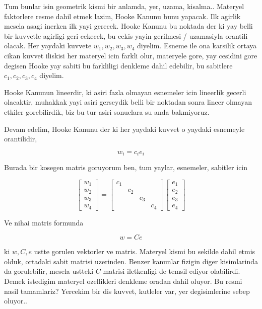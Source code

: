 \documentclass[12pt,fleqn]{article}\usepackage{../../common}
\begin{document}
Tum bunlar isin geometrik kismi bir anlamda, yer, uzama, kisalma.. Materyel
faktorlere resme dahil etmek lazim, Hooke Kanunu bunu yapacak. Ilk agirlik
mesela asagi inerken ilk yayi gerecek. Hooke Kanunu bu noktada der ki yay belli
bir kuvvetle agirligi geri cekecek, bu cekis yayin gerilmesi / uzamasiyla
orantili olacak. Her yaydaki kuvvete $w_1,w_2,w_3,w_4$ diyelim. Esneme ile ona
karsilik ortaya cikan kuvvet iliskisi her materyel icin farkli olur, materyele
gore, yay cesidini gore degisen Hooke yay sabiti bu farkliligi denkleme dahil
edebilir, bu sabitlere $c_1,c_2,c_3,c_4$ diyelim.

Hooke Kanunun lineerdir, ki asiri fazla olmayan esnemeler icin lineerlik
gecerli olacaktir, muhakkak yayi asiri gerseydik belli bir noktadan sonra
lineer olmayan etkiler gorebilirdik, biz bu tur asiri sonuclara su anda
bakmiyoruz.

Devam edelim, Hooke Kanunu der ki her yaydaki kuvvet o yaydaki esnemeyle orantilidir,

$$
w_i = c_i e_i 
$$

Burada bir kosegen matris goruyorum ben, tum yaylar, esnemeler, sabitler icin

$$
\left[\begin{array}{c}
w_1 \\ w_2 \\ w_3 \\ w_4
\end{array}\right] =
\left[\begin{array}{cccc}
c_1 & & & \\  & c_2 & & \\  & & c_3 & \\ & & & c_4
\end{array}\right]
\left[\begin{array}{c}
e_1 \\ e_2 \\ e_3 \\ e_4
\end{array}\right] 
$$

Ve nihai matris formunda

$$
w = C e
$$

ki $w,C,e$ ustte gorulen vektorler ve matris. Materyel kismi bu sekilde dahil
etmis olduk, ortadaki sabit matrisi uzerinden. Benzer kanunlar fizigin diger
kisimlarinda da gorulebilir, mesela ustteki $C$ matrisi iletkenligi de temsil
ediyor olabilirdi. Demek istedigim materyel ozellikleri denkleme oradan dahil
oluyor. Bu resmi nasil tamamlariz? Yercekim bir dis kuvvet, kutleler var, yer
degisimlerine sebep oluyor..
\end{document}
